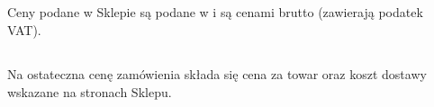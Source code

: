 
		
		\subsection{} Ceny podane w Sklepie są podane w \currency i są cenami brutto (zawierają podatek VAT).
		\subsection{} Na ostateczna cenę zamówienia składa się cena za towar oraz koszt dostawy wskazane na stronach Sklepu. 
